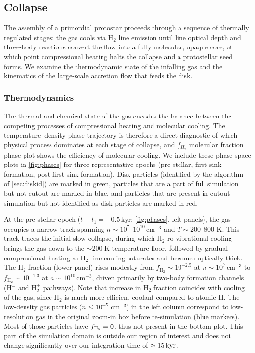 \documentclass[twocolumn]{openjournal}
\newcommand{\kyr}{\,\mathrm{kyr}}
\newcommand{\tform}{t_1}
\begin{document}
\subsection{Collapse}
\label{sec:collapse}

The assembly of a primordial protostar proceeds through a sequence of thermally regulated stages: the gas cools via H$_2$ line emission until line optical depth and three-body reactions convert the flow into a fully molecular, opaque core, at which point compressional heating halts the collapse and a protostellar seed forms.
We examine the thermodynamic state of the infalling gas and the kinematics of the large-scale accretion flow that feeds the disk.

\subsubsection{Thermodynamics}
\label{sec:thermo}

The thermal and chemical state of the gas encodes the balance between the competing processes of compressional heating and molecular cooling.
The temperature--density phase trajectory is therefore a direct diagnostic of which physical process dominates at each stage of collapse, and $f_{H_2}$ molecular fraction phase plot shows the efficiency of molecular cooling. We include these
phase space plots in \autoref{fig:phases} for three representative epochs (pre-stellar,
first sink formation, post-first sink formation). Disk particles (identified by
the algorithm of \autoref{sec:diskid}) are marked in green, particles that
are a part of full simulation but not cutout are marked in blue, and particles
that are present in cutout simulation but not identified as disk particles are
marked in red.

At the pre-stellar epoch ($t - \tform = -0.5\kyr$; \autoref{fig:phases}, left
panels), the gas occupies a narrow track spanning $n \sim
	10^7$--$10^{10}\,\mathrm{cm}^{-3}$ and $T \sim 200$--$800$ K. This track traces
the initial slow collapse, during which H$_2$ ro-vibrational cooling brings the
gas down to the $\sim 200$ K temperature floor, followed by gradual
compressional heating as H$_2$ line cooling saturates and becomes optically
thick. The H$_2$ fraction (lower panel) rises modestly from $f_{\mathrm{H}_2}
	\sim 10^{-2.5}$ at $n \sim 10^7\,\mathrm{cm}^{-3}$ to $f_{\mathrm{H}_2} \sim
	10^{-1.3}$ at $n \sim 10^{10}\,\mathrm{cm}^{-3}$, driven primarily by two-body
formation channels (H$^-$ and H$_2^+$ pathways). Note that increase in H$_2$
fraction coincides with cooling of the gas, since H$_2$ is much more efficient
coolant compared to atomic H. The low-density gas particles ($n \leq 10^{-5}$
cm$^{-3}$) in the left column correspond to low-resolution gas in the original zoom-in box before re-simulation (blue markers). Most of those particles have
$f_{\rm H_2} = 0$, thus not present in the bottom plot.
This part of the simulation domain is outside our region of interest and does not change significantly over our integration time of $\approx 15 \, \rm kyr$.
\end{document}
